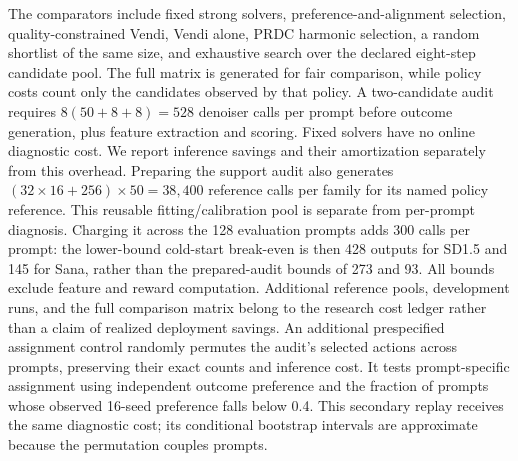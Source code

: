 The comparators include fixed strong solvers, preference-and-alignment selection,
quality-constrained Vendi, Vendi alone, PRDC harmonic selection, a random
shortlist of the same size, and exhaustive search over the declared eight-step
candidate pool. The full matrix is generated for fair comparison, while policy
costs count only the candidates observed by that policy. A two-candidate audit
requires $8(50+8+8)=528$ denoiser calls per prompt before outcome generation,
plus feature extraction and scoring. Fixed solvers have no online diagnostic
cost. We report inference savings and their amortization separately from
this overhead.
Preparing the support audit also generates $(32\times16+256)\times50=38{,}400$
reference calls per family for its named policy reference. This reusable
fitting/calibration pool is separate from per-prompt diagnosis. Charging it
across the 128 evaluation prompts adds 300 calls per prompt: the lower-bound
cold-start break-even is then 428 outputs for SD1.5 and 145 for Sana, rather
than the prepared-audit bounds of 273 and 93. All bounds exclude feature and
reward computation. Additional reference pools, development runs, and the full
comparison matrix belong to the research cost ledger rather than a claim of
realized deployment savings.
An additional prespecified assignment control randomly permutes the audit's
selected actions across prompts, preserving their exact counts and inference
cost. It tests prompt-specific assignment using independent outcome preference
and the fraction of prompts whose observed 16-seed preference falls below 0.4.
This secondary replay receives the same diagnostic cost; its conditional
bootstrap intervals are approximate because the permutation couples prompts.

